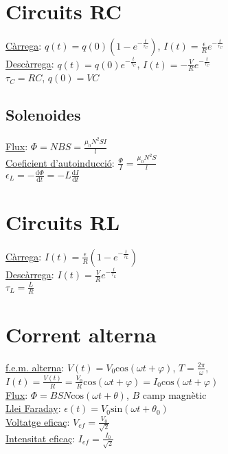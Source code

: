 \documentclass[12pt]{article}
\begin{document}
\begin{multicols}{5}
\section{Circuits RC}

\underline{Càrrega}: $q(t) = q(0)\left( 1 - e^{-\frac{t}{\tau_C}}\right)$, $I(t) = \frac{\epsilon}{R} e^{-\frac{t}{\tau_C}}$ \\
\underline{Descàrrega}: $q(t) = q(0)e^{-\frac{t}{\tau_C}}$, $I(t) = -\frac{V}{R}e^{-\frac{t}{\tau_C}}$ \\

$\tau_C = RC$, $q(0) = VC$

\subsection{Solenoides}

\underline{Flux}: $\Phi = NBS = \frac{\mu_0 N^2SI}{l}$ \\
\underline{Coeficient d'autoinducció}: $\frac{\Phi}{I} = \frac{\mu_0N^2S}{l}$ \\
$\epsilon_L= -\frac{\text{d}\Phi}{\text{d}t} = -L \frac{\text{d}I}{\text{d}t}$

\section{Circuits RL}
\underline{Càrrega}: $I(t) = \frac{\epsilon}{R} \left(1 - e^{-\frac{t}{\tau_L}}\right)$ \\
\underline{Descàrrega}: $I(t) = \frac{V}{R}e^{-\frac{t}{\tau_L}}$ \\
$\tau_L = \frac{L}{R}$

\section{Corrent alterna}
\underline{f.e.m. alterna}: $V(t) = V_0\text{cos}(\omega t+\varphi)$, $T = \frac{2\pi}{\omega}$, $I(t) = \frac{V(t)}{R} = \frac{V_0}{R}\text{cos}(\omega t + \varphi) = I_0\text{cos}(\omega t + \varphi)$ \\
\underline{Flux}: $\Phi = BSN\text{cos}(\omega t+\theta)$, $B$ camp magnètic \\
\underline{Llei Faraday}: $\epsilon(t) = V_0\text{sin}(\omega t + \theta_0)$ \\
\underline{Voltatge eficaç}: $V_{ef} = \frac{V_0}{\sqrt{2}}$ \\
\underline{Intensitat eficaç}: $I_{ef} = \frac{I_0}{\sqrt{2}}$


\end{multicols}
\end{document}
